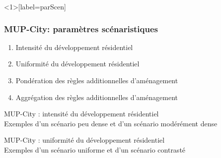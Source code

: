 \documentclass[xcolor=table]{beamer}
\begin{document}
\begin{frame}<1>[label=parScen]
\frametitle{MUP-City: paramètres scénaristiques}
	\begin{enumerate}
		\item \alert<1>{Intensité du développement résidentiel}
		\item<2-> \alert<2>{Uniformité du développement résidentiel}
		\item<3-> \alert<3>{Pondération des règles additionnelles d'aménagement}
		\item<4> \alert<4>{Aggrégation des règles additionnelles d'aménagement}
	\end{enumerate}
\end{frame}

\begin{frame}{MUP-City : intensité du développement résidentiel}
\vspace{1cm}
\\
{\footnotesize Exemples d'un scénario peu dense et d'un scénario modérément dense}
\end{frame}


\begin{frame}{MUP-City : uniformité du développement résidentiel}
\vspace{1cm}
\\
{\footnotesize Exemples d'un scénario uniforme et d'un scénario contrasté}
\end{frame}
\end{document}
